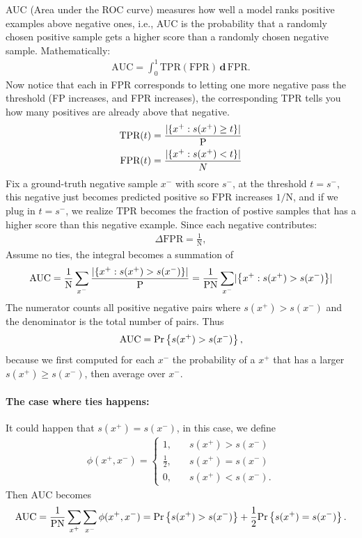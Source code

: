 \documentclass[11pt]{article}  %
\begin{document}
AUC (Area under the ROC curve) measures how well a model ranks positive examples above negative ones, i.e., AUC is the probability that a randomly chosen positive sample gets a higher score than a randomly chosen negative sample.
Mathematically:
\begin{align*}
  \text{AUC} = \int_{0}^{1} \text{TPR}(\text{FPR})\, \textbf{d}\, \text{FPR}.
\end{align*}
Now notice that each in FPR corresponds to letting one more negative pass the threshold (FP increases, and FPR increases), the corresponding TPR tells you how many positives are already above that negative.
\begin{align*}
  \text{TPR}(t) &= \frac{\lvert\left\{ x^+: s(x^{+}) \geq t \right\}\rvert}{\text{P}} \\
  \text{FPR}(t) &= \frac{\lvert\left\{ x^+: s(x^{+}) < t \right\} \rvert}{N}
\end{align*}
Fix a ground-truth negative sample $x^-$ with score $s^-$, at the threshold $t = s^-$, this negative just becomes predicted positive so $\text{FPR}$ increases $1/\text{N}$, and if we plug in $t = s^-$, we realize $\text{TPR}$ becomes the fraction of postive samples that has a higher score than this negative example.
Since each negative contributes:
\begin{align*}
  \Delta \text{FPR} = \frac{1}{\text{N}},
\end{align*}
Assume no ties, the integral becomes a summation of 
\begin{align*}
  \text{AUC} = \frac{1}{\text{N}} \sum_{x^-} \frac{\lvert \left\{ x^+ : s(x^+) > s(x^-)  \right\}\rvert}{\text{P}} = \frac{1}{\text{PN}}\sum_{x^-}\lvert \left\{ x^+: s(x^+) > s(x^-)  \right\}\rvert
\end{align*}
The numerator counts all positive negative pairs where $s(x^+) > s(x^-)$ and the denominator is the total number of pairs.
Thus 
\begin{align*}
  \text{AUC} = \text{Pr}\left\{ s(x^+) > s(x^-) \right\},
\end{align*}
because we first computed for each $x^-$ the probability of a $x^{+}$ that has a larger $s(x^{+}) \geq s(x^{-})$, then average over $x^-$.

\paragraph{The case where ties happens:}
It could happen that $s(x^+) = s(x^-)$, in this case, we define 
\begin{align*}
  \phi(x^+, x^-) = \begin{cases}
    1, &\quad s(x^+) > s(x^-) \\
    \frac{1}{2}, &\quad s(x^+) = s(x^-) \\
    0, &\quad s(x^+) < s(x^-).
  \end{cases}
\end{align*}
Then AUC becomes 
\begin{align*}
  \text{AUC} = \frac{1}{\text{PN}} \sum_{x^+}\sum_{x^-} \phi(x^+, x^-) = \text{Pr}\left\{ s(x^+) > s(x^-) \right\} + \frac{1}{2}\text{Pr}\left\{ s(x^+) = s(x^-) \right\}.
\end{align*}
\end{document}
